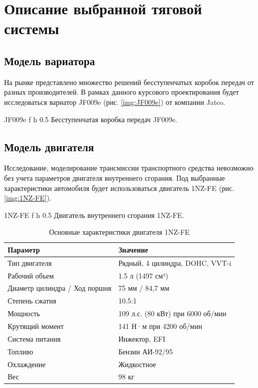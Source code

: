 \chapter{Описание выбранной тяговой системы}

\section{Модель вариатора}

На рынке представлено множество решений бесступенчатых коробок передач от разных производителей. В рамках данного курсового проектирования будет исследоваться вариатор JF009e (рис. \ref{img:JF009e}) от компании Jatco.

    {JF009e} %
    {f} %
    {h} %
    {0.5\textwidth} %
    {Бесступенчатая коробка передач JF009e.} %

\section{Модель двигателя}

Исследование, моделирование трансмиссии транспортного средства невозможно без учета параметров двигателя внутреннего сгорания. Под выбранные характеристики автомобиля будет использоваться двигатель 1NZ-FE (рис. \ref{img:1NZ-FE}).

    {1NZ-FE} %
    {f} %
    {h} %
    {0.5\textwidth} %
    {Двигатель внутреннего сгорания 1NZ-FE.} %

\begin{table}[h]
    \centering
    \caption{Основные характеристики двигателя 1NZ-FE}
    \begin{tabularx}{\textwidth}{|l|X|}
        \hline
        \textbf{Параметр} & \textbf{Значение} \\
        \hline
        Тип двигателя & Рядный, 4 цилиндра, DOHC, VVT-i \\
        \hline
        Рабочий объем & 1.5 л (1497 см³) \\
        \hline
        Диаметр цилиндра / Ход поршня & 75 мм / 84,7 мм \\
        \hline
        Степень сжатия & 10.5:1 \\
        \hline
        Мощность & 109 л.с. (80 кВт) при 6000 об/мин \\
        \hline
        Крутящий момент & 141 Н·м при 4200 об/мин \\
        \hline
        Система питания & Инжектор, EFI \\
        \hline
        Топливо & Бензин АИ-92/95 \\
        \hline
        Охлаждение & Жидкостное \\
        \hline
        Вес & 98 кг \\
        \hline
    \end{tabularx}
\end{table}

